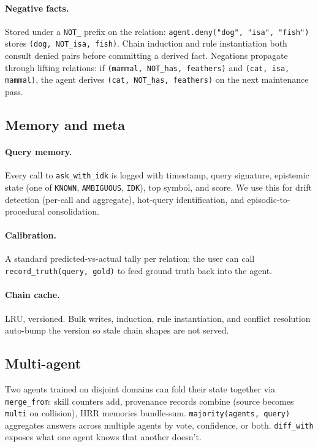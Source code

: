 \documentclass[11pt]{article}
\begin{document}
\paragraph{Negative facts.} Stored under a \texttt{NOT\_} prefix on
the relation: \texttt{agent.deny("dog", "isa", "fish")} stores
\texttt{(dog, NOT\_isa, fish)}. Chain induction and rule
instantiation both consult denied pairs before committing a derived
fact. Negations propagate through lifting relations: if
\texttt{(mammal, NOT\_has, feathers)} and \texttt{(cat, isa, mammal)},
the agent derives \texttt{(cat, NOT\_has, feathers)} on the next
maintenance pass.

\subsection{Memory and meta}

\paragraph{Query memory.} Every call to \texttt{ask\_with\_idk} is
logged with timestamp, query signature, epistemic state (one of
\texttt{KNOWN}, \texttt{AMBIGUOUS}, \texttt{IDK}), top symbol, and
score. We use this for drift detection (per-call and aggregate),
hot-query identification, and episodic-to-procedural consolidation.

\paragraph{Calibration.} A standard predicted-vs-actual tally per
relation; the user can call \texttt{record\_truth(query, gold)} to
feed ground truth back into the agent.

\paragraph{Chain cache.} LRU, versioned. Bulk writes,
induction, rule instantiation, and conflict resolution auto-bump
the version so stale chain shapes are not served.

\subsection{Multi-agent}

Two agents trained on disjoint domains can fold their state together
via \texttt{merge\_from}: skill counters add, provenance records
combine (source becomes \texttt{multi} on collision), HRR memories
bundle-sum. \texttt{majority(agents, query)} aggregates answers
across multiple agents by vote, confidence, or both. \texttt{diff\_with}
exposes what one agent knows that another doesn't.
\end{document}
